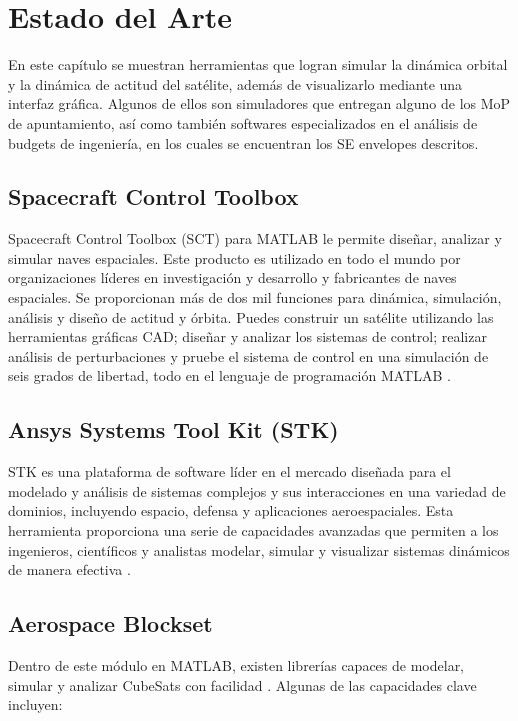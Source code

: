 \section{Estado del Arte}

En este capítulo se muestran herramientas que logran simular la dinámica orbital y la dinámica de actitud del satélite, además de visualizarlo mediante una interfaz gráfica. Algunos de ellos son simuladores que entregan alguno de los MoP de apuntamiento, así como también softwares especializados en el análisis de budgets de ingeniería, en los cuales se encuentran los SE envelopes descritos.

\subsection{Spacecraft Control Toolbox}

Spacecraft Control Toolbox (SCT) para MATLAB le permite diseñar, analizar y simular naves espaciales. Este producto es utilizado en todo el mundo por organizaciones líderes en investigación y desarrollo y fabricantes de naves espaciales. Se proporcionan más de dos mil funciones para dinámica, simulación, análisis y diseño de actitud y órbita. Puedes construir un satélite utilizando las herramientas gráficas CAD; diseñar y analizar los sistemas de control; realizar análisis de perturbaciones y pruebe el sistema de control en una simulación de seis grados de libertad, todo en el lenguaje de programación MATLAB \cite{ref18}.


\subsection{Ansys Systems Tool Kit (STK)}

STK es una plataforma de software líder en el mercado diseñada para el modelado y análisis de sistemas complejos y sus interacciones en una variedad de dominios, incluyendo espacio, defensa y aplicaciones aeroespaciales. Esta herramienta proporciona una serie de capacidades avanzadas que permiten a los ingenieros, científicos y analistas modelar, simular y visualizar sistemas dinámicos de manera efectiva \cite{ref34}.

\subsection{Aerospace Blockset}

Dentro de este módulo en MATLAB, existen librerías capaces de modelar, simular y analizar CubeSats con facilidad \cite{ref19}. Algunas de las capacidades clave incluyen:

